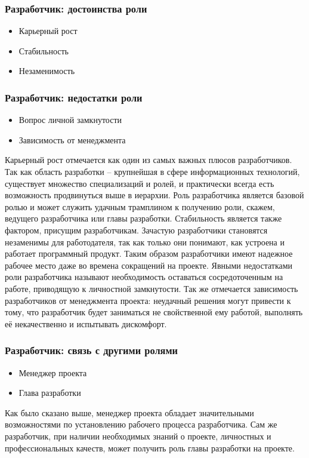 \documentclass{../industrial-development}
\begin{document}
\begin{frame} \frametitle{Разработчик: достоинства роли}
  \begin{itemize}
	\item Карьерный рост
	\item Стабильность
	\item Незаменимость
	\end{itemize}
\end{frame}

\begin{frame} \frametitle{Разработчик: недостатки роли}
  \begin{itemize}
	\item Вопрос личной замкнутости
	\item Зависимость от менеджмента
	\end{itemize}
\end{frame}

\lecturenotes

Карьерный рост отмечается как один из самых важных плюсов разработчиков. Так как область разработки – крупнейшая в сфере информационных технологий, существует множество специализаций и ролей, и практически всегда есть возможность продвинуться выше в иерархии. Роль разработчика является базовой ролью и может служить удачным трамплином к получению роли, скажем, ведущего разработчика или главы разработки.
Стабильность является также фактором, присущим разработчикам. Зачастую разработчики становятся незаменимы для работодателя, так как только они понимают, как устроена и работает программный продукт. Таким образом разработчики имеют надежное рабочее место даже во времена сокращений на проекте. 
Явными недостатками роли разработчика называют необходимость оставаться сосредоточенным на работе, приводящую к личностной замкнутости. Так же отмечается зависимость разработчиков от менеджмента проекта: неудачный решения могут привести к тому, что разработчик будет заниматься не свойственной ему работой, выполнять её некачественно и испытывать дискомфорт. 
  ~\cite{Anatomy}

\begin{frame} \frametitle{Разработчик: связь с другими ролями}
  \begin{itemize}
	\item Менеджер проекта
	\item Глава разработки
	\end{itemize}
\end{frame}
\lecturenotes
Как было сказано выше, менеджер проекта обладает значительными возможностями по установлению рабочего процесса разработчика. Сам же разработчик, при наличии необходимых знаний о проекте, личностных и профессиональных качеств, может получить роль главы разработки на проекте.  ~\cite{Anatomy}
\end{document}
